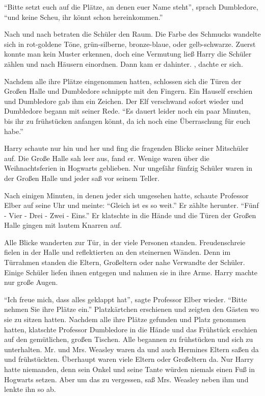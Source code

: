 \enquote{Bitte setzt euch auf die Plätze, an denen euer Name steht}, sprach Dumbledore, \enquote{und keine Scheu, ihr könnt schon hereinkommen.}

Nach und nach betraten die Schüler den Raum. Die Farbe des Schmucks wandelte sich in rot-goldene Töne, grün-silberne, bronze-blaue, oder gelb-schwarze. Zuerst konnte man kein Muster erkennen, doch eine Vermutung ließ Harry die Schüler zählen und nach Häusern einordnen. Dann kam er dahinter. , dachte er sich.

Nachdem alle ihre Plätze eingenommen hatten, schlossen sich die Türen der Großen Halle und Dumbledore schnippte mit den Fingern. Ein Hauself erschien und Dumbledore gab ihm ein Zeichen. Der Elf verschwand sofort wieder und Dumbledore begann mit seiner Rede. \enquote{Es dauert leider noch ein paar Minuten, bis ihr zu frühstücken anfangen könnt, da ich noch eine Überraschung für euch habe.}

Harry schaute nur hin und her und fing die fragenden Blicke seiner Mitschüler auf. Die Große Halle sah leer aus, fand er. Wenige waren über die Weihnachtsferien in Hogwarts geblieben. Nur ungefähr fünfzig Schüler waren in der Großen Halle und jeder saß vor seinem Teller.

Nach einigen Minuten, in denen jeder sich umgesehen hatte, schaute Professor Elber auf seine Uhr und meinte: \enquote{Gleich ist es so weit.} Er zählte herunter. \enquote{Fünf - Vier - Drei - Zwei - Eins.} Er klatschte in die Hände und die Türen der Großen Halle gingen mit lautem Knarren auf.

Alle Blicke wanderten zur Tür, in der viele Personen standen. Freudenschreie fielen in der Halle und reflektierten an den steinernen Wänden. Denn im Türrahmen standen die Eltern, Großeltern oder nahe Verwandte der Schüler. Einige Schüler liefen ihnen entgegen und nahmen sie in ihre Arme. Harry machte nur große Augen.

\enquote{Ich freue mich, dass alles geklappt hat}, sagte Professor Elber wieder. \enquote{Bitte nehmen Sie ihre Plätze ein.} Platzkärtchen erschienen und zeigten den Gästen wo sie zu sitzen hatten. Nachdem alle ihre Plätze gefunden und Platz genommen hatten, klatschte Professor Dumbledore in die Hände und das Frühstück erschien auf den gemütlichen, großen Tischen. Alle begannen zu frühstücken und sich zu unterhalten. Mr. und Mrs. Weasley waren da und auch Hermines Eltern saßen da und frühstückten. Überhaupt waren viele Eltern oder Großeltern da. Nur Harry hatte niemanden, denn sein Onkel und seine Tante würden niemals einen Fuß in Hogwarts setzen. Aber um das zu vergessen, saß Mrs. Weasley neben ihm und lenkte ihn so ab.

